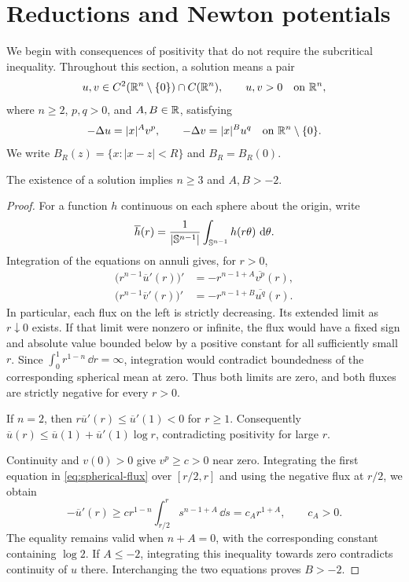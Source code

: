 \section{Reductions and Newton potentials}\label{sec:preliminaries}

We begin with consequences of positivity that do not require the
subcritical inequality.  Throughout this section, a solution means a pair
\[
 u,v\in C^2(\mathbb R^n\setminus\{0\})\cap C(\mathbb R^n),\qquad u,v>0
 \quad\hbox{on }\mathbb R^n,
\]
where $n\ge2$, $p,q>0$, and $A,B\in\mathbb R$, satisfying
\[
 -\Delta u=|x|^A v^p,\qquad -\Delta v=|x|^B u^q
 \quad\hbox{on }\mathbb R^n\setminus\{0\}.
\]
We write $B_R(z)=\{x:|x-z|<R\}$ and $B_R=B_R(0)$.

\begin{lemma}\label{lem:reductions}
The existence of a solution implies $n\ge3$ and $A,B>-2$.
\end{lemma}

\begin{proof}
For a function $h$ continuous on each sphere about the origin, write
\[
 \overline h(r)=\frac1{|\mathbb S^{n-1}|}\int_{\mathbb S^{n-1}}h(r\theta)\,\,\mathrm d\theta.
\]
Integration of the equations on annuli gives, for $r>0$,
\begin{equation}\label{eq:spherical-flux}
 \begin{split}
  \bigl(r^{n-1}\overline u'(r)\bigr)'
     &=-r^{n-1+A}\overline{v^p}(r),\\
  \bigl(r^{n-1}\overline v'(r)\bigr)'
     &=-r^{n-1+B}\overline{u^q}(r).
 \end{split}
\end{equation}
In particular, each flux on the left is strictly decreasing.  Its extended
limit as $r\downarrow0$ exists.  If that limit were nonzero or infinite,
the flux would have a fixed sign and absolute value bounded below by a
positive constant for all sufficiently small $r$.  Since
$\int_0^1 r^{1-n}\,\dd r=\infty$, integration would contradict boundedness
of the corresponding spherical mean at zero.  Thus both limits are zero,
and both fluxes are strictly negative for every $r>0$.

If $n=2$, then $r\overline u'(r)\le\overline u'(1)<0$ for $r\ge1$.
Consequently
$\overline u(r)\le\overline u(1)+\overline u'(1)\log r$, contradicting
positivity for large $r$.

Continuity and $v(0)>0$ give $v^p\ge c>0$ near zero.  Integrating the first
equation in \eqref{eq:spherical-flux} over $[r/2,r]$ and using the negative
flux at $r/2$, we obtain
\[
 -\overline u'(r)
 \ge c r^{1-n}\int_{r/2}^r s^{n-1+A}\,\dd s
 =c_A r^{1+A},\qquad c_A>0.
\]
The equality remains valid when $n+A=0$, with the corresponding constant
containing $\log2$.  If $A\le-2$, integrating this inequality towards
zero contradicts continuity of $u$ there.  Interchanging the two equations
proves $B>-2$.
\end{proof}

